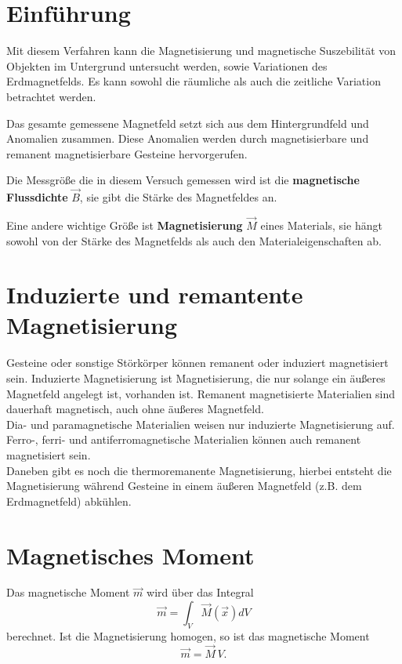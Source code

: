 \section{Einführung}

Mit diesem Verfahren kann die Magnetisierung und magnetische Suszebilität von Objekten im Untergrund untersucht werden, sowie Variationen des Erdmagnetfelds. Es kann sowohl die räumliche als auch die zeitliche Variation 
betrachtet werden.

Das gesamte gemessene Magnetfeld setzt sich aus dem Hintergrundfeld und Anomalien zusammen. Diese Anomalien 
 werden durch magnetisierbare und remanent magnetisierbare Gesteine hervorgerufen. 

Die Messgröße die in diesem Versuch gemessen wird ist die \textbf{magnetische Flussdichte} $\vec{B}$, sie gibt die Stärke des Magnetfeldes an.

Eine andere wichtige Größe ist \textbf{Magnetisierung} $\vec{M}$ eines Materials, sie hängt sowohl von der Stärke des Magnetfelds als auch den Materialeigenschaften ab.\\

\section{Induzierte und remantente Magnetisierung}
Gesteine oder sonstige Störkörper können remanent oder induziert magnetisiert sein. Induzierte Magnetisierung ist Magnetisierung, die nur solange ein äußeres Magnetfeld angelegt ist, vorhanden ist. Remanent magnetisierte 
Materialien sind dauerhaft magnetisch, auch ohne äußeres Magnetfeld.\\
Dia- und paramagnetische Materialien weisen nur induzierte Magnetisierung auf. Ferro-, ferri- und antiferromagnetische Materialien können auch remanent magnetisiert sein. \\
Daneben gibt es noch die thermoremanente Magnetisierung, hierbei entsteht die Magnetisierung während Gesteine in einem äußeren Magnetfeld (z.B. dem Erdmagnetfeld) abkühlen.


\section{Magnetisches Moment}
Das magnetische Moment $\vec{m}$  wird über das Integral
\begin{equation}
\vec{m}  = \int_V \vec{M}(\vec{x}) dV
\end{equation}
berechnet.
Ist die Magnetisierung homogen, so ist das magnetische Moment
\begin{equation}
\vec{m}  = \vec{M} \,V.
\end{equation}

